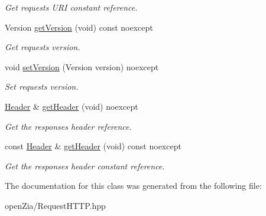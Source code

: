 \begin{DoxyCompactItemize}
\begin{DoxyCompactList}\small\item\em Get request\textquotesingle{}s U\+RI constant reference. \end{DoxyCompactList}\item 
\mbox{\label{classo_z_1_1o_z_1_1_h_t_t_p_1_1_request_ab7224cf669a39fe5385351728ce25797}} 
Version \mbox{\hyperlink{classo_z_1_1o_z_1_1_h_t_t_p_1_1_request_ab7224cf669a39fe5385351728ce25797}{get\+Version}} (void) const noexcept
\begin{DoxyCompactList}\small\item\em Get request\textquotesingle{}s version. \end{DoxyCompactList}\item 
\mbox{\label{classo_z_1_1o_z_1_1_h_t_t_p_1_1_request_a1678781402c85346e87000fe154338ad}} 
void \mbox{\hyperlink{classo_z_1_1o_z_1_1_h_t_t_p_1_1_request_a1678781402c85346e87000fe154338ad}{set\+Version}} (Version version) noexcept
\begin{DoxyCompactList}\small\item\em Set request\textquotesingle{}s version. \end{DoxyCompactList}\item 
\mbox{\label{classo_z_1_1o_z_1_1_h_t_t_p_1_1_request_acdf258d4e597e670186b8758932d8a1f}} 
\mbox{\hyperlink{classo_z_1_1o_z_1_1_h_t_t_p_1_1_header}{Header}} \& \mbox{\hyperlink{classo_z_1_1o_z_1_1_h_t_t_p_1_1_request_acdf258d4e597e670186b8758932d8a1f}{get\+Header}} (void) noexcept
\begin{DoxyCompactList}\small\item\em Get the response\textquotesingle{}s header reference. \end{DoxyCompactList}\item 
\mbox{\label{classo_z_1_1o_z_1_1_h_t_t_p_1_1_request_a6d9b74125b18ffd91062fa69fdadb3c9}} 
const \mbox{\hyperlink{classo_z_1_1o_z_1_1_h_t_t_p_1_1_header}{Header}} \& \mbox{\hyperlink{classo_z_1_1o_z_1_1_h_t_t_p_1_1_request_a6d9b74125b18ffd91062fa69fdadb3c9}{get\+Header}} (void) const noexcept
\begin{DoxyCompactList}\small\item\em Get the response\textquotesingle{}s header constant reference. \end{DoxyCompactList}\end{DoxyCompactItemize}


The documentation for this class was generated from the following file\+:\begin{DoxyCompactItemize}
\item 
open\+Zia/Request\+H\+T\+T\+P.\+hpp\end{DoxyCompactItemize}
